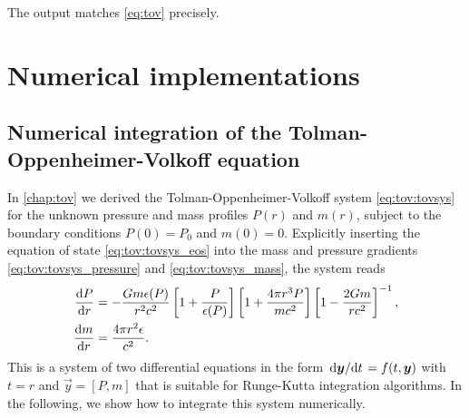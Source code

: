 
The output matches \cref{eq:tov} precisely.

\chapter{Numerical implementations}

\section{Numerical integration of the Tolman-Oppenheimer-Volkoff equation}
\label{sec:nstars:numtov}

In \cref{chap:tov} we derived the Tolman-Oppenheimer-Volkoff system \eqref{eq:tov:tovsys} for the unknown pressure and mass profiles $P(r)$ and $m(r)$, subject to the boundary conditions $P(0) = P_0$ and $m(0) = 0$.
Explicitly inserting the equation of state \eqref{eq:tov:tovsys_eos} into the mass and pressure gradients \eqref{eq:tov:tovsys_pressure} and \eqref{eq:tov:tovsys_mass}, the system reads
\begin{subequations}
\label{eq:numtov:tovsys}
\begin{align}
	\odv{P}{r} &= -\frac{G m \epsilon(P)}{r^2 c^2} \left[ 1 + \frac{P}{\epsilon(P)} \right] \left[ 1 + \frac{4 \pi r^3 P}{m c^2} \right] \left[ 1 - \frac{2 G m}{r c^2} \right]^{-1} , \label{eq:numtov:tov_pressure} \\
	\odv{m}{r} &= \frac{4 \pi r^2 \epsilon}{c^2} . \label{eq:numtov:tov_mass}
\end{align}
\end{subequations}
This is a system of two differential equations in the form $\odv{\vec{y}}/{t} = f(t, \vec{y})$ with $t=r$ and $\vec{y} = [P, m]$ that is suitable for Runge-Kutta integration algorithms.
In the following, we show how to integrate this system numerically.

